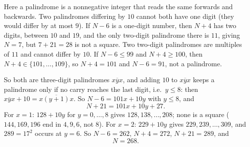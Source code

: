 Here a palindrome is a nonnegative integer that reads the same forwards and backwards. Two palindromes differing by $10$ cannot both have one digit (they would differ by at most $9$). If $N-6$ is a one-digit number, then $N+4$ has two digits, between $10$ and $19$, and the only two-digit palindrome there is $11$, giving $N=7$, but $7+21=28$ is not a square. Two two-digit palindromes are multiples of $11$ and cannot differ by $10$. If $N-6\le99$ and $N+4\ge100$, then $N+4\in\{101,\dots,109\}$, so $N+4=101$ and $N-6=91$, not a palindrome.

So both are three-digit palindromes $\overline{xyx}$, and adding $10$ to $\overline{xyx}$ keeps a palindrome only if no carry reaches the last digit, i.e.\ $y\le8$: then $\overline{xyx}+10=\overline{x(y+1)x}$. So $N-6=101x+10y$ with $y\le8$, and
\[
N+21=101x+10y+27 .
\]
For $x=1$: $128+10y$ for $y=0,\dots,8$ gives $128,138,\dots,208$; none is a square ($144,169,196$ end in $4,9,6$, not $8$). For $x=2$: $229+10y$ gives $229,239,\dots,309$, and $289=17^2$ occurs at $y=6$. So $N-6=262$, $N+4=272$, $N+21=289$, and
\[
N=\boxed{268}.
\]
